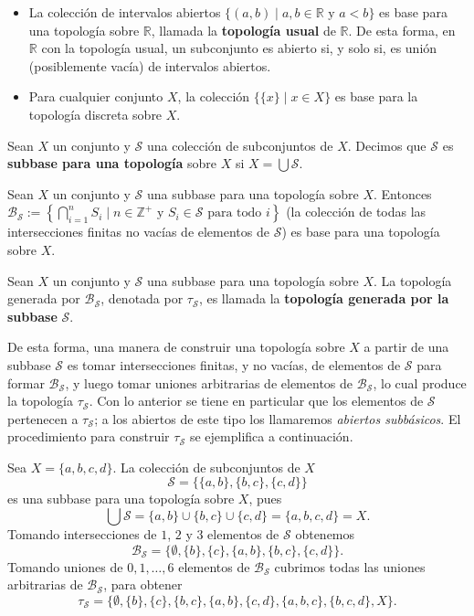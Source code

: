 \begin{Ejm}\label{Ejm:Bases}
   \phantom{o}\par
   \begin{itemize}
      \item La colección de intervalos abiertos $\{(a,b)\mid a,b\in \mathbb{R} \text{ y } a<b\}$ es base para una topología sobre $\mathbb{R}$, llamada la \textbf{topología usual} de $\mathbb{R}$. De esta forma, en $\mathbb{R}$ con la topología usual, un subconjunto es abierto si, y solo si, es unión (posiblemente vacía) de intervalos abiertos.
      \item Para cualquier conjunto $X$, la colección $\{\{ x\}\mid x\in X\}$ es base para la topología discreta sobre $X$.
   \end{itemize}
\end{Ejm}
\begin{Def}
   Sean $X$ un conjunto y $\mathcal{S}$ una colección de subconjuntos de $X$. Decimos que $\mathcal{S}$ es \textbf{subbase para una topología} sobre $X$ si $X=\bigcup \mathcal{S}$. 
\end{Def}
\begin{Prop}
   Sean $X$ un conjunto y $\mathcal{S}$ una subbase para una topología sobre $X$. Entonces $\mathcal{B}_\mathcal{S}:=\left\lbrace \bigcap_{i=1}^{n}S_i \mid n\in \mathbb{Z}^+ \text{ y } S_i\in \mathcal{S} \text{ para todo }i \right\rbrace$ (la colección de todas las intersecciones finitas no vacías de elementos de $\mathcal{S}$) es base para una topología sobre $X$.
\end{Prop}
\begin{Def}
   Sean $X$ un conjunto y $\mathcal{S}$ una subbase para una topología sobre $X$. La topología generada por $\mathcal{B}_\mathcal{S}$, denotada por $\tau_\mathcal{S}$, es llamada la \textbf{topología generada por la subbase} $\mathcal{S}$.
\end{Def}
De esta forma, una manera de construir una topología sobre $X$ a partir de una subbase $\mathcal{S}$ es tomar intersecciones finitas, y no vacías, de elementos de $\mathcal{S}$ para formar $\mathcal{B}_\mathcal{S}$, y luego tomar uniones arbitrarias de elementos de $\mathcal{B}_\mathcal{S}$, lo cual produce la topología $\tau_\mathcal{S}$. Con lo anterior se tiene en particular que los elementos de $\mathcal{S}$ pertenecen a $\tau_\mathcal{S}$; a los abiertos de este tipo los llamaremos \textit{abiertos subbásicos}. El procedimiento para construir $\tau_\mathcal{S}$ se ejemplifica a continuación.
\begin{Ejm}
   Sea $X=\{a,b,c,d\}$. La colección de subconjuntos de $X$ 
   $$
   \mathcal{S} = \{\{a, b\}, \{b, c\}, \{c, d\}\}
   $$
   es una subbase para una topología sobre $X$, pues
   $$
   \bigcup \mathcal{S} = \{a, b\} \cup \{b, c\} \cup \{c, d\} = \{a, b, c, d\} = X.
   $$
   Tomando intersecciones de $1$, $2$ y $3$ elementos de $\mathcal{S}$ obtenemos
   $$
   \mathcal{B}_\mathcal{S} = \{\emptyset, \{b\}, \{c\}, \{a, b\}, \{b, c\}, \{c, d\}\}.
   $$
   Tomando uniones de $0,1,\dots,6$ elementos de $\mathcal{B}_\mathcal{S}$ cubrimos todas las uniones arbitrarias de $\mathcal{B}_\mathcal{S}$, para obtener
   $$
   \tau_\mathcal{S} = \{\emptyset, \{b\}, \{c\}, \{b, c\}, \{a, b\}, \{c, d\}, \{a, b, c\}, \{b, c, d\}, X\}.
   $$
\end{Ejm}
